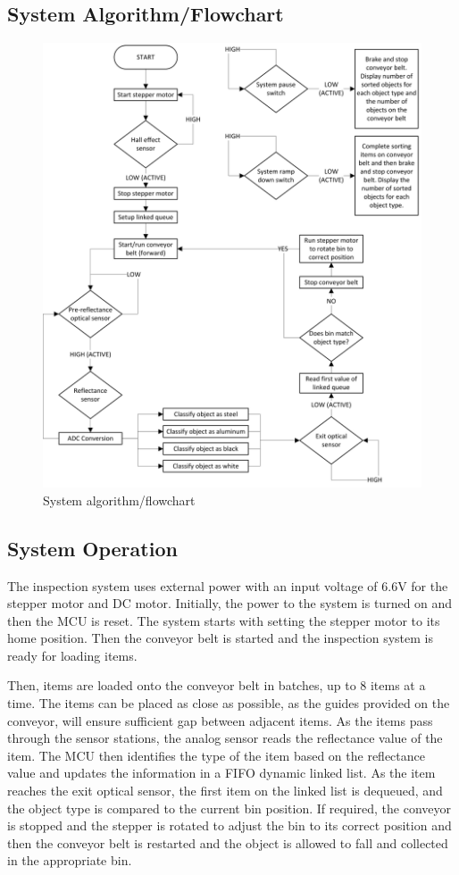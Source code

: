 \subsection{System Algorithm/Flowchart}
\begin{figure}[tbph]
	\centering
	\includegraphics[width=0.89\linewidth]{"images/flowchart"}
	\caption{System algorithm/flowchart}
	\label{fig:ABCD}
\end{figure}

\subsection{System Operation}
The inspection system uses external power with an input voltage of 6.6V for the stepper motor and DC motor. Initially, the power to the system is turned on and then the MCU is reset. The system starts with setting the stepper motor to its home position. Then the conveyor belt is started and the inspection system is ready for loading items.

Then, items are loaded onto the conveyor belt in batches, up to 8 items at a time. The items can be placed as close as possible, as the guides provided on the conveyor, will ensure sufficient gap between adjacent items. As the items pass through the sensor stations, the analog sensor reads the reflectance value of the item. The MCU then identifies the type of the item based on the reflectance value and updates the information in a FIFO dynamic linked list. As the item reaches the exit optical sensor, the first item on the linked list is dequeued, and the object type is compared to the current bin position. If required, the conveyor is stopped and the stepper is rotated to adjust the bin to its correct position and then the conveyor belt is restarted and the object is allowed to fall and collected in the appropriate bin.

